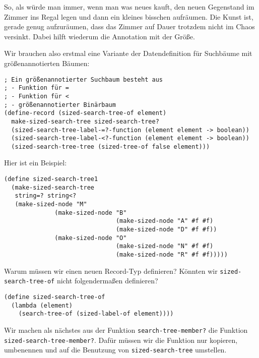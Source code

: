 So, als würde man immer, wenn man was neues kauft, den neuen
Gegenstand im Zimmer ins Regal legen und dann ein kleines bisschen
aufräumen.  Die Kunst ist, gerade genug aufzuräumen, dass das Zimmer
auf Dauer trotzdem nicht im Chaos versinkt.  Dabei hilft wiederum die
Annotation mit der Größe.

Wir brauchen also erstmal eine Variante der Datendefinition für
Suchbäume mit größenannotierten Bäumen:
%
\begin{lstlisting}
; Ein größenannotierter Suchbaum besteht aus
; - Funktion für =
; - Funktion für <
; - größenannotierter Binärbaum
(define-record (sized-search-tree-of element)
  make-sized-search-tree sized-search-tree?
  (sized-search-tree-label-=?-function (element element -> boolean))
  (sized-search-tree-label-<?-function (element element -> boolean))
  (sized-search-tree-tree (sized-tree-of false element)))
\end{lstlisting}
%
Hier ist ein Beispiel:
%
\begin{lstlisting}
(define sized-search-tree1
  (make-sized-search-tree
   string=? string<?
   (make-sized-node "M"
              (make-sized-node "B"
                               (make-sized-node "A" #f #f)
                               (make-sized-node "D" #f #f))
              (make-sized-node "O"
                               (make-sized-node "N" #f #f)
                               (make-sized-node "R" #f #f)))))
\end{lstlisting}
% 
\begin{aufgabeinline}
  Warum müssen wir einen neuen Record-Typ definieren?  Könnten wir
  \lstinline{sized-search-tree-of} nicht folgendermaßen definieren?
\begin{lstlisting}
(define sized-search-tree-of
  (lambda (element)
    (search-tree-of (sized-label-of element))))
\end{lstlisting}
\end{aufgabeinline}
%
Wir machen als nächstes aus der Funktion
\lstinline{search-tree-member?} die Funktion
\lstinline{sized-search-tree-member?}.  Dafür müssen wir die Funktion
nur kopieren, umbenennen und auf die Benutzung von
\lstinline{sized-search-tree} umstellen.
%
